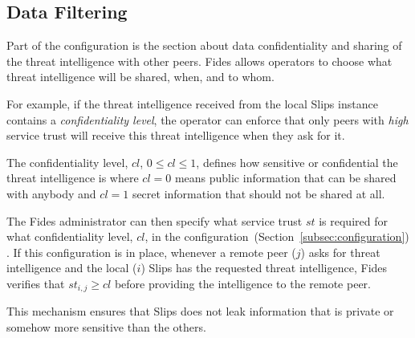 \subsection{Data Filtering}
\label{subsec:data-filtering}
Part of the configuration is the section about data confidentiality and sharing of the threat intelligence with other peers.
Fides allows operators to choose what threat intelligence will be shared, when, and to whom.

For example, if the threat intelligence received from the local Slips instance contains a \textit{confidentiality level}, the operator can enforce that only peers with \textit{high} service trust will receive this threat intelligence when they ask for it.

The confidentiality level, $cl$, $0 \leq cl \leq 1$, defines how sensitive or confidential the threat intelligence is where $cl = 0$ means public information that can be shared with anybody and $cl = 1$ secret information that should not be shared at all.

The Fides administrator can then specify what service trust $st$ is required for what confidentiality level, $cl$, in the configuration~(Section~\ref{subsec:configuration}) .
If this configuration is in place, whenever a remote peer ($j$) asks for threat intelligence and the local ($i$) Slips has the requested threat intelligence, Fides verifies that $st_{i, j} \geq cl$ before providing the intelligence to the remote peer.

This mechanism ensures that Slips does not leak information that is private or somehow more sensitive than the others.